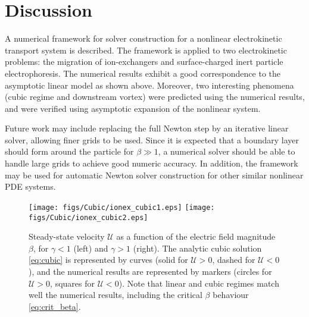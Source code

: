\documentclass[10pt]{ijnam}
\newcommand\cU{\mathscr{U}}
\begin{document}
\section{Discussion} \label{sec:discussion}
A numerical framework for solver construction for a
nonlinear electrokinetic transport system is described.
The framework is applied to two electrokinetic problems: the migration of ion-exchangers
and surface-charged inert particle electrophoresis.
The numerical results exhibit a good correspondence to the asymptotic linear model as
shown above.
Moreover, two interesting phenomena (cubic regime and downstream vortex) were predicted
using the numerical results, and were verified using asymptotic expansion of the
nonlinear system.

Future work may include replacing the full Newton step by an iterative linear solver, allowing
finer grids to be used.
Since it is expected that a boundary layer should form around the particle for $\beta \gg 1$,
a numerical solver should be able to handle large grids to achieve good numeric accuracy.
In addition, the framework may be used for automatic Newton solver construction for 
other similar nonlinear PDE systems.

\begin{figure}[htbp]
    \begin{center}
    \texttt{[image: figs/Cubic/ionex\_cubic1.eps]}
    \texttt{[image: figs/Cubic/ionex\_cubic2.eps]}
        \caption{Steady-state velocity $\cU$ as a function of the 
        electric field magnitude $\beta$, for $\gamma < 1$ (left) and $\gamma > 1$ (right). 
        The analytic cubic solution \eqref{eq:cubic} is represented by curves
        (solid for $\cU > 0$, dashed for $\cU < 0$), 
        and the numerical results are represented by markers 
        (circles for $\cU > 0$, squares for $\cU < 0$). Note that linear and
        cubic regimes match well the numerical results, including the critical $\beta$ 
        behaviour \eqref{eq:crit_beta}. 
        }
	    \label{fig:IonExCubic}
    \end{center}
\end{figure}
\end{document}

